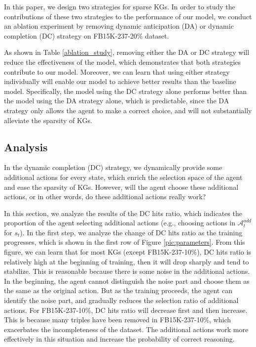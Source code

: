 \documentclass[11pt,a4paper]{article}
\begin{document}
In this paper, we design two strategies for sparse KGs. In order to study the contributions of these two strategies to the performance of our model, we conduct an ablation experiment by removing dynamic anticipation (DA) or dynamic completion (DC) strategy on FB15K-237-20\% dataset. 

As shown in Table \ref{ablation_study}, removing either the DA or DC strategy will reduce the effectiveness of the model, which demonstrates that both strategies contribute to our model. Moreover, we can learn that using either strategy individually will enable our model to achieve better results than the baseline model. Specifically, the model using the DC strategy alone performs better than the model using the DA strategy alone, which is predictable, since the DA strategy only allows the agent to make a correct choice, and will not substantially alleviate the sparsity of KGs.

\subsection{Analysis}

In the dynamic completion (DC) strategy, we dynamically provide some additional actions for every state, which enrich the selection space of the agent and ease the sparsity of KGs. However, will the agent choose these additional actions, or in other words, do these additional actions really work? 

In this section, we analyze the results of the DC hits ratio, which indicates the proportion of the agent selecting additional actions (e.g., choosing actions in $\mathcal{A}_t^{add}$ for $s_t$). In the first step, we analyze the change of DC hits ratio as the training progresses, which is shown in the first row of Figure \ref{pic:parameters}. From this figure, we can learn that for most KGs (except FB15K-237-10\%), DC hits ratio is relatively high at the beginning of training, then it will drop sharply and tend to stabilize. This is reasonable because there is some noise in the additional actions. In the beginning, the agent cannot distinguish the noise part and choose them as the same as the original action. But as the training proceeds, the agent can identify the noise part, and gradually reduces the selection ratio of additional actions. For FB15K-237-10\%, DC hits ratio will decrease first and then increase. This is because many triples have been removed in FB15K-237-10\%, which exacerbates the incompleteness of the dataset. The additional actions work more effectively in this situation and increase the probability of correct reasoning. 
\end{document}
